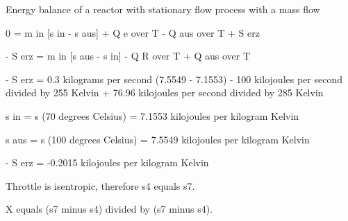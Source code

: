 Energy balance of a reactor with stationary flow process with a mass flow

0 = m in [s in - s aus] + Q e over T - Q aus over T + S erz

- S erz = m in [s aus - s in] - Q R over T + Q aus over T

- S erz = 0.3 kilograms per second (7.5549 - 7.1553) - 100 kilojoules per second divided by 255 Kelvin + 76.96 kilojoules per second divided by 285 Kelvin

s in = s (70 degrees Celsius) = 7.1553 kilojoules per kilogram Kelvin

s aus = s (100 degrees Celsius) = 7.5549 kilojoules per kilogram Kelvin

- S erz = -0.2015 kilojoules per kilogram Kelvin

Throttle is isentropic, therefore s4 equals s7.

X equals (s7 minus s4) divided by (s7 minus s4).